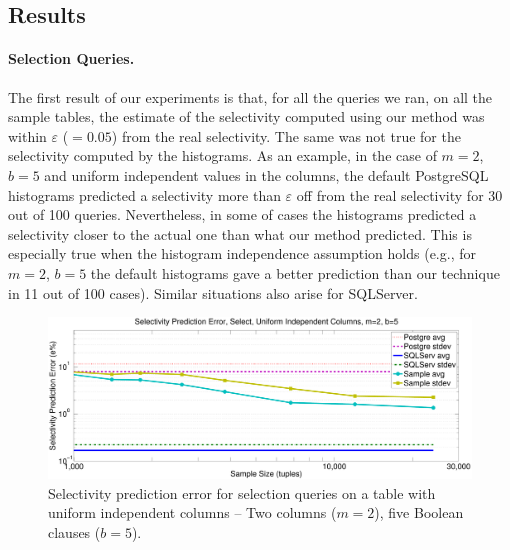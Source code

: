 \subsection{Results}
\paragraph{Selection Queries.} The first result of our experiments is that, for
all the queries we ran, on all the sample tables, the estimate of the
selectivity computed using our method was within
$\varepsilon$ ($=0.05$) from the real selectivity. The same was not true for the
selectivity computed by the histograms. As an example, in the case of $m=2$,
$b=5$ and uniform independent values in the columns, the default PostgreSQL
histograms predicted a selectivity more than $\varepsilon$ off from the real
selectivity for 30 out of 100 queries.  Nevertheless, in some of cases the
histograms predicted a selectivity closer to the actual one than what our method
predicted. This is especially true when the histogram independence assumption
holds (e.g., for $m=2$, $b=5$ the default histograms gave a better prediction
than our technique in 11 out of 100 cases). Similar situations also arise for
SQLServer.

\begin{figure}[htbp]
  \centering
  \includegraphics[scale=0.30]{vcfreq/T_k5_u200k_unif_k2_b5_errperc}
  \caption{Selectivity prediction error for selection queries on a table with
  uniform independent columns -- Two columns ($m=2$), five Boolean clauses ($b=5$).}
  \label{fig:vcfreqT_k5_u200k_unif_k2_b5_errperc}
\end{figure}

